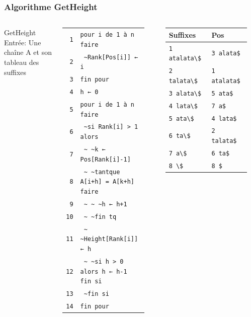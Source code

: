 \documentclass[10pt]{beamer}
\begin{document}
\begin{frame}
  \frametitle{Algorithme GetHeight}
  \scriptsize
  \begin{columns}
      GetHeight\\
      Entrée: Une chaîne A et son tableau des suffixes\\ \hfill \\
      \begin{tabular}{r|l}
        \texttt{1}  & \verb!pour i de 1 à n faire!\\
        \texttt{2}  & \verb! ~Rank[Pos[i]] ← i!\\
        \texttt{3}  & \verb!fin pour!\\
        \texttt{4}  & \verb!h ← 0!\\
        \texttt{5}  & \verb!pour i de 1 à n faire!\\
        \texttt{6}  & \verb! ~si Rank[i] > 1 alors!\\
        \texttt{7}  & \verb! ~ ~k ← Pos[Rank[i]-1]!\\
        \texttt{8}  & \verb! ~ ~tantque A[i+h] = A[k+h] faire!\\
        \texttt{9}  & \verb! ~ ~ ~h ← h+1!\\
        \texttt{10} & \verb! ~ ~fin tq!\\
        \texttt{11} & \verb! ~ ~Height[Rank[i]] ← h!\\
        \texttt{12} & \verb! ~ ~si h > 0 alors h ← h-1 fin si!\\
        \texttt{13} & \verb! ~fin si!\\
        \texttt{14} & \verb!fin pour!\\
      \end{tabular}\\
    \begin{minipage}[c][.6\textheight][c]{\linewidth}
      \pause
      \begin{tabular}{ll}
        Suffixes & Pos\\
        \hline
        \verb!1 atalata\$! & \texttt{\alert<3,5>{3 alata\$}}\\
        \verb!2 talata\$!  & \texttt{\alert<3,7>{1 atalata\$}}\\
        \verb!3 alata\$!   & \texttt{\alert<7>{5 ata\$}}\\
        \verb!4 lata\$!    & \texttt{\alert<6>{7 a\$}}\\
        \verb!5 ata\$!     & \texttt{\alert<4,6>{4 lata\$}}\\
        \verb!6 ta\$!      & \texttt{\alert<4>{2 talata\$}}\\
        \verb!7 a\$!       & \texttt{6 ta\$}\\
        \verb!8 \$!        & \texttt{8 \$}\\
      \end{tabular}\\
      \hfill \\ \hfill \\


\end{minipage}
\end{columns}
\end{frame}
\end{document}
